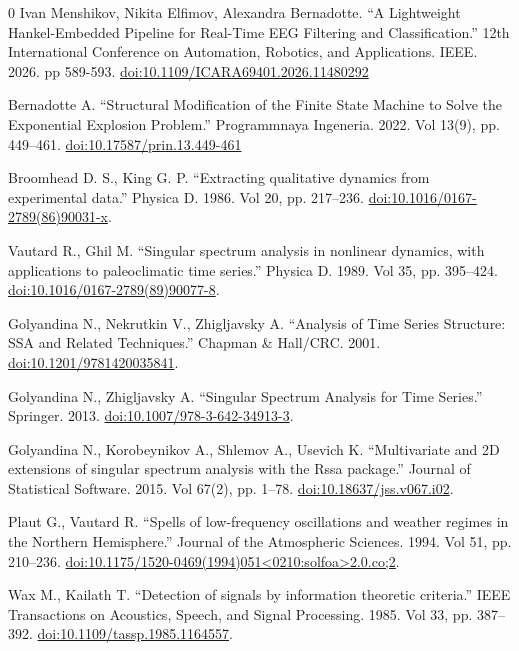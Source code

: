 \documentclass{article}
\begin{document}
\begin{thebibliography}{0}
 Ivan Menshikov, Nikita Elfimov, Alexandra Bernadotte.  ``A Lightweight Hankel-Embedded Pipeline for Real-Time EEG Filtering and Classification.''  12th International Conference on Automation, Robotics, and Applications. IEEE. 2026. pp 589-593. \href{https://doi.org/10.1109/ICARA69401.2026.11480292}{doi:10.1109/ICARA69401.2026.11480292}

 Bernadotte A. ``Structural Modification of the Finite State Machine to Solve the Exponential Explosion Problem.'' Programmnaya Ingeneria. 2022. Vol 13(9), pp. 449--461. \href{https://doi.org/10.17587/prin.13.449-461}{doi:10.17587/prin.13.449-461}

 Broomhead D. S., King G. P. ``Extracting qualitative dynamics from experimental data.'' Physica D. 1986. Vol 20, pp. 217--236. \href{https://doi.org/10.1016/0167-2789(86)90031-x}{doi:10.1016/0167-2789(86)90031-x}.

 Vautard R., Ghil M. ``Singular spectrum analysis in nonlinear dynamics, with applications to paleoclimatic time series.'' Physica D. 1989. Vol 35, pp. 395--424. \href{https://doi.org/10.1016/0167-2789(89)90077-8}{doi:10.1016/0167-2789(89)90077-8}.

 Golyandina N., Nekrutkin V., Zhigljavsky A. ``Analysis of Time Series Structure: SSA and Related Techniques.'' Chapman \& Hall/CRC. 2001. \href{https://doi.org/10.1201/9781420035841}{doi:10.1201/9781420035841}.

 Golyandina N., Zhigljavsky A. ``Singular Spectrum Analysis for Time Series.'' Springer. 2013. \href{https://doi.org/10.1007/978-3-642-34913-3}{doi:10.1007/978-3-642-34913-3}.

 Golyandina N., Korobeynikov A., Shlemov A., Usevich K. ``Multivariate and 2D extensions of singular spectrum analysis with the Rssa package.'' Journal of Statistical Software. 2015. Vol 67(2), pp. 1--78. \href{https://doi.org/10.18637/jss.v067.i02}{doi:10.18637/jss.v067.i02}.

 Plaut G., Vautard R. ``Spells of low-frequency oscillations and weather regimes in the Northern Hemisphere.'' Journal of the Atmospheric Sciences. 1994. Vol 51, pp. 210--236. \href{https://doi.org/10.1175/1520-0469(1994)051<0210:solfoa>2.0.co;2}{doi:10.1175/1520-0469(1994)051<0210:solfoa>2.0.co;2}.

 Wax M., Kailath T. ``Detection of signals by information theoretic criteria.'' IEEE Transactions on Acoustics, Speech, and Signal Processing. 1985. Vol 33, pp. 387--392. \href{https://doi.org/10.1109/tassp.1985.1164557}{doi:10.1109/tassp.1985.1164557}.


\end{thebibliography}
\end{document}

